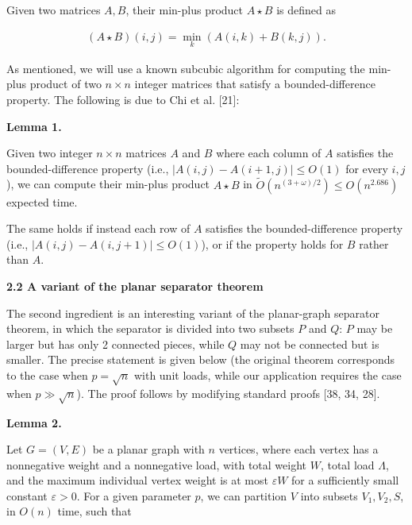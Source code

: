 Given two matrices $A,B$, their min-plus product $A\star B$ is defined as
\par
\[\begin{aligned}
(A\star B)(i,j)=\min_{k}(A(i,k)+B(k,j)).
\end{aligned}\]
\par
As mentioned, we will use a known subcubic algorithm for computing the min-plus product of two $n\times n$ integer matrices that satisfy a bounded-difference property. The following is due to Chi et al. [21]:
\par
\par
\par\medskip\noindent\textbf{Lemma 1.}\par
Given two integer $n\times n$ matrices $A$ and $B$ where each column of $A$ satisfies the bounded-difference property (i.e., $|A(i,j)-A(i+1,j)|\leq O(1)$ for every $i,j$), we can compute their min-plus product $A\star B$ in $\widetilde{O}(n^{(3+\omega)/2})\leq O(n^{2.686})$ expected time.
\par
\par
The same holds if instead each row of $A$ satisfies the bounded-difference property (i.e., $|A(i,j)-A(i,j+1)|\leq O(1)$), or if the property holds for $B$ rather than $A$.
\par
\par
\par
\par\medskip\noindent\textbf{2.2 A variant of the planar separator theorem}\par
The second ingredient is an interesting variant of the planar-graph separator theorem, in which the separator is divided into two subsets $P$ and $Q$: $P$ may be larger but has only 2 connected pieces, while $Q$ may not be connected but is smaller. The precise statement is given below (the original theorem corresponds to the case when $p=\sqrt{n}$ with unit loads, while our application requires the case when $p\gg\sqrt{n}$). The proof follows by modifying standard proofs [38, 34, 28].
\par
\par
\par\medskip\noindent\textbf{Lemma 2.}\par
Let $G=(V,E)$ be a planar graph with $n$ vertices, where each vertex has a nonnegative weight and a nonnegative load, with total weight $W$, total load $\Lambda$, and the maximum individual vertex weight is at most $\varepsilon W$ for a sufficiently small constant $\varepsilon>0$. For a given parameter $p$, we can partition $V$ into subsets $V_{1},V_{2},S$, in $O(n)$ time, such that
